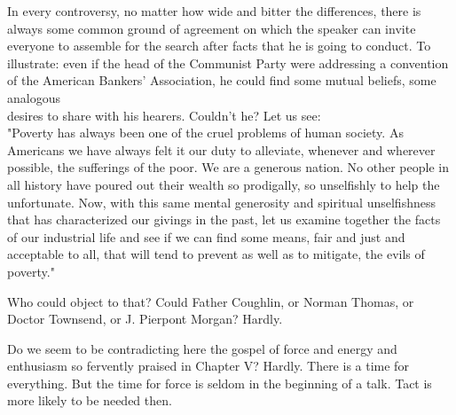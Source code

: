 \documentclass[10pt]{article}
\begin{document}
In every controversy, no matter how wide and bitter the differences, there is always some common ground of agreement on which the speaker can invite everyone to assemble for the search after facts that he is going to conduct. To illustrate: even if the head of the Communist Party were addressing a convention of the American Bankers' Association, he could find some mutual beliefs, some analogous\\
desires to share with his hearers. Couldn't he? Let us see:\\
"Poverty has always been one of the cruel problems of human society. As Americans we have always felt it our duty to alleviate, whenever and wherever possible, the sufferings of the poor. We are a generous nation. No other people in all history have poured out their wealth so prodigally, so unselfishly to help the unfortunate. Now, with this same mental generosity and spiritual unselfishness that has characterized our givings in the past, let us examine together the facts of our industrial life and see if we can find some means, fair and just and acceptable to all, that will tend to prevent as well as to mitigate, the evils of poverty."

Who could object to that? Could Father Coughlin, or Norman Thomas, or Doctor Townsend, or J. Pierpont Morgan? Hardly.

Do we seem to be contradicting here the gospel of force and energy and enthusiasm so fervently praised in Chapter V? Hardly. There is a time for everything. But the time for force is seldom in the beginning of a talk. Tact is more likely to be needed then.
\end{document}
